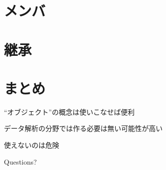 \documentclass[12pt, xetex, xcolor=pdftex, dvipsnames]{beamer}
\begin{document}
\section{メンバ}

\section{継承}

\section{まとめ}
\begin{frame}
    ``オブジェクト''の概念は使いこなせば便利

    データ解析の分野では作る必要は無い可能性が高い

    使えないのは危険
\end{frame}
\begin{frame}[standout]
  Questions?
\end{frame}
\end{document}
